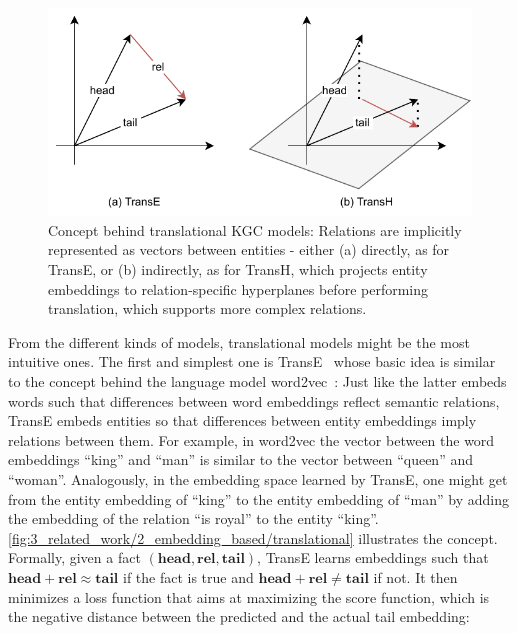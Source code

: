 \begin{figure}[t]
    \centering
    \includegraphics{3_related_work/2_embedding_based/translational}
    \caption{Concept behind translational KGC models: Relations are implicitly represented as vectors between entities - either (a) directly, as for TransE, or (b) indirectly, as for TransH, which projects entity embeddings to relation-specific hyperplanes before performing translation, which supports more complex relations.}
    \label{fig:3_related_work/2_embedding_based/translational}
\end{figure}

From the different kinds of models, translational models might be the most intuitive ones. The first and simplest one is TransE~\cite{Bordes2013TranslatingEF} whose basic idea is similar to the concept behind the language model word2vec~\cite{Mikolov2013EfficientEO}: Just like the latter embeds words such that differences between word embeddings reflect semantic relations, TransE embeds entities so that differences between entity embeddings imply relations between them. For example, in word2vec the vector between the word embeddings ``king'' and ``man'' is similar to the vector between ``queen'' and ``woman''. Analogously, in the embedding space learned by TransE, one might get from the entity embedding of ``king'' to the entity embedding of ``man'' by adding the embedding of the relation ``is royal'' to the entity ``king''. \autoref{fig:3_related_work/2_embedding_based/translational} illustrates the concept. Formally, given a fact $(\textbf{head}, \textbf{rel}, \textbf{tail})$, TransE learns embeddings such that $\textbf{head} + \textbf{rel} \approx \textbf{tail}$ if the fact is true and $\textbf{head} + \textbf{rel} \neq \textbf{tail}$ if not. It then minimizes a loss function that aims at maximizing the score function, which is the negative distance between the predicted and the actual tail embedding:

